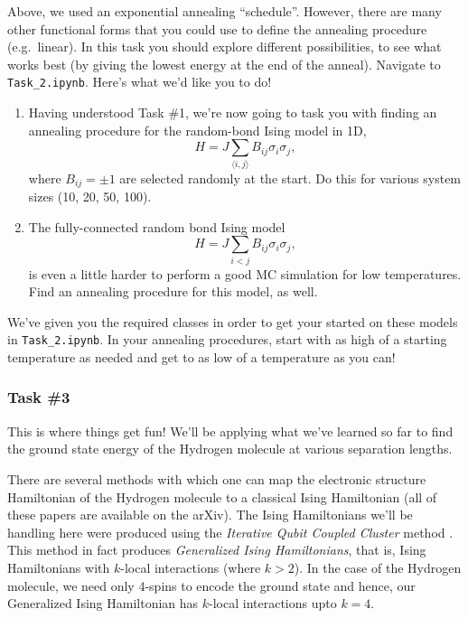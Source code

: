 \documentclass[12pt]{article}
\begin{document}
Above, we used an exponential annealing ``schedule''.  However, there are many other functional forms that you could use to define the annealing procedure (e.g.~linear).
In this task you should explore different possibilities, to see what works best (by giving the lowest energy at the end of the anneal).
Navigate to \texttt{Task\_2.ipynb}. Here's what we'd like you to do!
\begin{enumerate}
    \item Having understood Task \#1, we're now going to task you with finding an annealing procedure for the random-bond Ising model in 1D,
    \begin{equation}
        H = J\sum_{\langle i,j \rangle} B_{ij}\sigma_i\sigma_j,
    \end{equation}
    where $B_{ij} = \pm 1$ are selected randomly at the start. Do this for various system sizes (10, 20, 50, 100).
    \item The fully-connected random bond Ising model
    \begin{equation}
        H = J \sum_{i < j} B_{ij}\sigma_i\sigma_j,
    \end{equation}
    is even a little harder to perform a good MC simulation for low temperatures. Find an annealing procedure for this model, as well.
\end{enumerate}
We've given you the required classes in order to get your started on these models in \texttt{Task\_2.ipynb}. In your annealing procedures, start with as high of a starting temperature as needed and get to as low of a temperature as you can!

\subsubsection*{Task \#3}
This is where things get fun!
We'll be applying what we've learned so far to find the ground state energy
of the Hydrogen molecule at various separation lengths.

There are several methods with which one can map the electronic structure Hamiltonian
of the Hydrogen molecule to a classical Ising Hamiltonian
\cite{iqcc,qcc,xia2016electronic,xia2017electronic} (all of these papers are available on the arXiv).
The Ising Hamiltonians we'll be handling here were produced using the
\textit{Iterative Qubit Coupled Cluster} method \cite{iqcc}. This method
in fact produces \textit{Generalized Ising Hamiltonians}, that is, Ising
Hamiltonians with $k$-local interactions (where $k > 2$).
In the case of the Hydrogen molecule, we need only 4-spins to encode the ground state and
hence, our Generalized Ising Hamiltonian has $k$-local interactions upto $k=4$.
\end{document}
